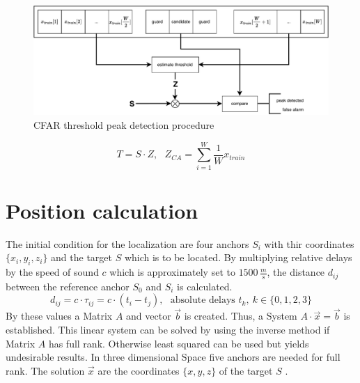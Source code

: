 %
\begin{figure}[h]
	\includegraphics[width=\linewidth]{images/peakdet}
	
	\caption{CFAR threshold peak detection procedure}
	\label{fig:simsig}
\end{figure}

\begin{equation}
	T=S\cdot Z,~~~Z_{CA}=\sum_{i=1}^{W}\dfrac{1}{W}x_{train}
	\label{eq:cff}
\end{equation}


\section{Position calculation}

The initial condition for the localization are four anchors $S_i$ with thir coordinates $\{x_i,y_i,z_i\}$ and the target $S$ which is to be located. By multiplying relative delays by the speed of sound $c$ which is approximately set to $1500\,\frac{m}{s}$, the distance $d_{ij}$ between the reference anchor $S_0$ and $S_i$ is calculated.\\
\begin{equation}
	d_{ij}=c\cdot\tau_{ij}=c\cdot (t_i-t_j),~~~\text{absolute delays } t_k,~k\in \{0,1,2,3\}
\end{equation}
By these values a Matrix $A$ and vector $\vec{b}$ is created. Thus, a System $A\cdot \vec{x}=\vec{b}$ is established. This linear system can be solved by using the inverse method if Matrix $A$ has full rank. Otherwise least squared can be used but yields undesirable results. In three dimensional Space five anchors are needed for full rank. The solution $\vec{x}$ are the coordinates $\{x,y,z\}$ of the target $S$ \cite{yang11}.


